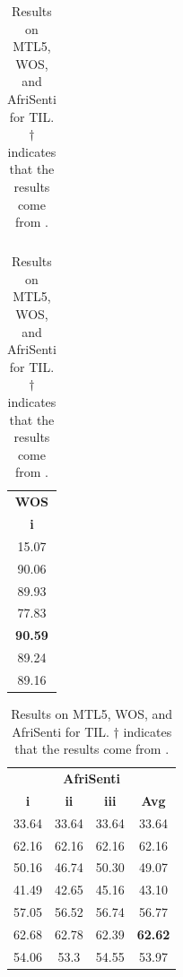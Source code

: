 \documentclass[11pt]{article}
\begin{document}
\begin{table}[]
\begin{tabular}{lccccc}
\hline
\end{tabular}
\begin{tabular}{c}
\hline
\multicolumn{1}{c}{\textbf{WOS}} \\
\multicolumn{1}{c}{\textbf{i}} \\
\hline
15.07                            \\
90.06                            \\
\hline
89.93                            \\
77.83                            \\
\textbf{90.59}                            \\
89.24                            \\
89.16                           \\
\hline
\end{tabular}
\begin{tabular}{cccc}
\hline
\multicolumn{4}{c}{\textbf{AfriSenti}}                                                                                              \\
\multicolumn{1}{c}{\textbf{i}} & \multicolumn{1}{c}{\textbf{ii}} & \multicolumn{1}{c}{\textbf{iii}} & \multicolumn{1}{c}{\textbf{Avg}} \\
\hline
33.64                          & 33.64                          & 33.64                          & 33.64                            \\
62.16                          & 62.16                          & 62.16                          & 62.16                            \\
\hline
50.16                          & 46.74                          & 50.30                          & 49.07                            \\
41.49                          & 42.65                          & 45.16                          & 43.10                            \\
57.05                          & 56.52                          & 56.74                          & 56.77                            \\
62.68                          & 62.78                          & 62.39                          & \textbf{62.62}                            \\
54.06                          & 53.3                           & 54.55                          & 53.97                          \\
\hline
\end{tabular}
\caption{Results on MTL5, WOS, and AfriSenti for TIL. $\dagger$ indicates that the results come from \cite{wang2024rehearsalfree}.}
\label{tab:til}
\end{table}
\end{document}
